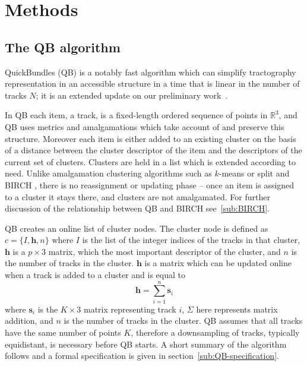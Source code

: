 \documentclass[preprint,authoryear,a4paper,10pt,onecolumn]{elsarticle}
\begin{document}
\section{Methods}

\subsection{The QB algorithm\label{sub:QB-description}}

QuickBundles (QB) is a notably fast algorithm which can simplify
tractography representation in an accessible structure in a time that is
linear in the number of tracks $N$; it is an extended update on our
preliminary work~\citep{EGMB10}.

In QB each item, a track, is a fixed-length ordered sequence of points
in $\mathbb{R}^{3}$, and QB uses metrics and amalgamations which take
account of and preserve this structure.  Moreover each item is either
added to an existing cluster on the basis of a distance between the
cluster descriptor of the item and the descriptors of the current set of
clusters. Clusters are held in a list which is extended according to
need. Unlike amalgamation clustering algorithms such as $k$-means or
split\citep{steinhaus1956division, macqueen1967some} and BIRCH
\citep{zhang1997birch}, there is no reassignment or updating phase --
once an item is assigned to a cluster it stays there, and clusters are
not amalgamated. For further discussion of the relationship between QB
and BIRCH see~\ref{sub:BIRCH}.

QB creates an online list of cluster nodes. The cluster node is defined
as $c=\{I,\mathbf{h},n\}$ where $I$ is the list of the integer indices
of the tracks in that cluster, $\mathbf{h}$ is a $p\times3$ matrix,
which the most important descriptor of the cluster, and $n$ is the
number of tracks in the cluster. $\mathbf{h}$ is a matrix which can be
updated online when a track is added to a cluster and is equal to
\begin{equation}
  \mathbf{h}=\sum_{i=1}^{n}\mathbf{s}_{i}
\end{equation} 
where $\mathbf{s}_{i}$ is the $K\times3$ matrix representing track $i$,
$\Sigma$ here represents matrix addition, and $n$ is the number of
tracks in the cluster. QB assumes that all tracks have the same number
of points $K$, therefore a downsampling of tracks, typically
equidistant, is necessary before QB starts. A short summary of the
algorithm follows and a formal specification is given in
section~\ref{sub:QB-specification}.
\end{document}
